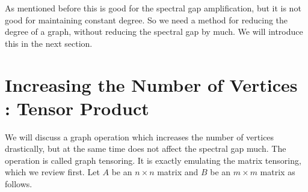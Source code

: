 As mentioned before this is good for the spectral gap amplification, but it is not good for maintaining constant degree. So we need a method for reducing the degree of a graph, without reducing the spectral gap by much. We will introduce this in the next section.

\section{Increasing the Number of Vertices : Tensor Product}

We will discuss a graph operation which increases the number of vertices drastically, but at the same time does not affect the spectral gap much. The operation is called graph tensoring. It is exactly emulating the matrix tensoring, which we review first. Let $A$ be an $n \times n$ matrix and $B$ be an $m \times m$ matrix as follows.

